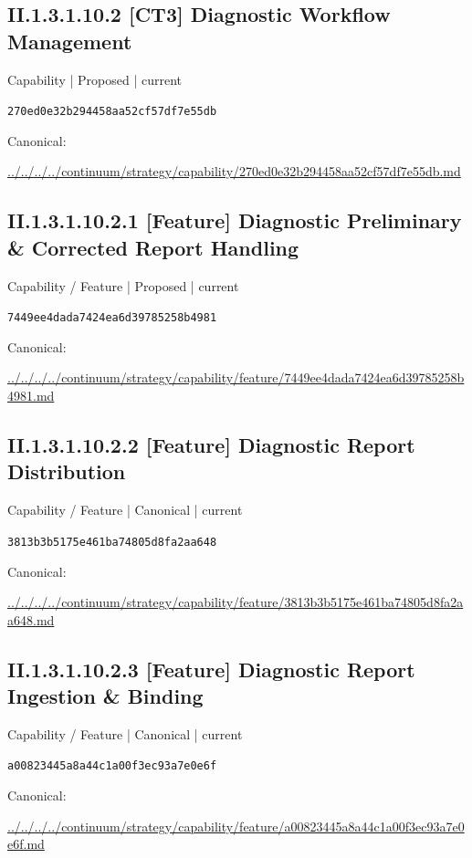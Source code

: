 \documentclass[10pt,a4paper]{article}
\begin{document}
\subsection*{II.1.3.1.10.2 [CT3] Diagnostic Workflow Management}
\label{element-270ed0e32b294458aa52cf57df7e55db}
{\small Capability | Proposed | current}\par
\texttt{270ed0e32b294458aa52cf57df7e55db}\par
Canonical: \par
{\footnotesize\url{../../../../continuum/strategy/capability/270ed0e32b294458aa52cf57df7e55db.md}}\par
\subsection*{II.1.3.1.10.2.1 [Feature] Diagnostic Preliminary \& Corrected Report Handling}
\label{element-7449ee4dada7424ea6d39785258b4981}
{\small Capability / Feature | Proposed | current}\par
\texttt{7449ee4dada7424ea6d39785258b4981}\par
Canonical: \par
{\footnotesize\url{../../../../continuum/strategy/capability/feature/7449ee4dada7424ea6d39785258b4981.md}}\par
\subsection*{II.1.3.1.10.2.2 [Feature] Diagnostic Report Distribution}
\label{element-3813b3b5175e461ba74805d8fa2aa648}
{\small Capability / Feature | Canonical | current}\par
\texttt{3813b3b5175e461ba74805d8fa2aa648}\par
Canonical: \par
{\footnotesize\url{../../../../continuum/strategy/capability/feature/3813b3b5175e461ba74805d8fa2aa648.md}}\par
\subsection*{II.1.3.1.10.2.3 [Feature] Diagnostic Report Ingestion \& Binding}
\label{element-a00823445a8a44c1a00f3ec93a7e0e6f}
{\small Capability / Feature | Canonical | current}\par
\texttt{a00823445a8a44c1a00f3ec93a7e0e6f}\par
Canonical: \par
{\footnotesize\url{../../../../continuum/strategy/capability/feature/a00823445a8a44c1a00f3ec93a7e0e6f.md}}\par
\end{document}
